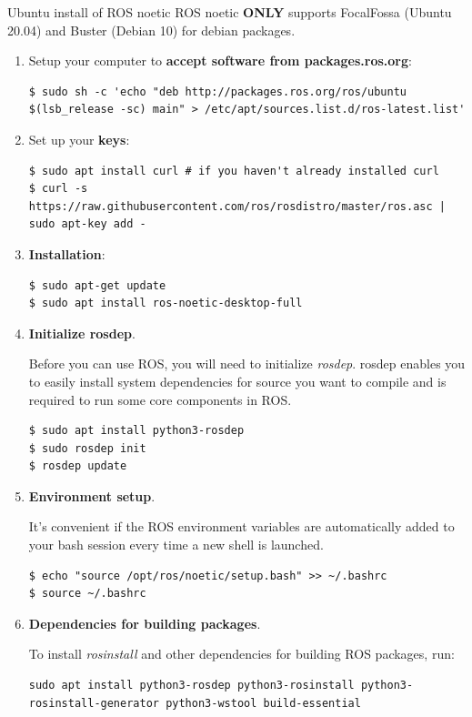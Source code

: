 \begin{frame}{Ubuntu install of ROS noetic}
ROS noetic \textbf{ONLY} supports FocalFossa (Ubuntu 20.04) and Buster (Debian 10) for debian packages. 
\begin{enumerate}
 \item Setup your computer to \textbf{accept software from packages.ros.org}:
\begin{lstlisting}[language=shell]
$ sudo sh -c 'echo "deb http://packages.ros.org/ros/ubuntu $(lsb_release -sc) main" > /etc/apt/sources.list.d/ros-latest.list'
\end{lstlisting}
 \item Set up your \textbf{keys}:
\begin{lstlisting}[language=shell]
$ sudo apt install curl # if you haven't already installed curl
$ curl -s https://raw.githubusercontent.com/ros/rosdistro/master/ros.asc | sudo apt-key add -
\end{lstlisting}
 \item \textbf{Installation}:
\begin{lstlisting}[language=shell]
$ sudo apt-get update
$ sudo apt install ros-noetic-desktop-full
\end{lstlisting}
 \item \textbf{Initialize rosdep}.
 
 \vspace{.1cm}
 Before you can use ROS, you will need to initialize \textit{rosdep}. rosdep enables you to easily install system dependencies for source you want to compile and is required to run some core components in ROS. 
\begin{lstlisting}[language=shell]
$ sudo apt install python3-rosdep
$ sudo rosdep init
$ rosdep update
\end{lstlisting}

 \item \textbf{Environment setup}.

 \vspace{.1cm}
 It's convenient if the ROS environment variables are automatically added to your bash session every time a new shell is launched.
\begin{lstlisting}[language=shell]
$ echo "source /opt/ros/noetic/setup.bash" >> ~/.bashrc
$ source ~/.bashrc
\end{lstlisting}

 \framebreak
 
 \item \textbf{Dependencies for building packages}.

 \vspace{.1cm}
 To install \textit{rosinstall} and other dependencies for building ROS packages, run: 
\begin{lstlisting}[language=shell]
sudo apt install python3-rosdep python3-rosinstall python3-rosinstall-generator python3-wstool build-essential
\end{lstlisting}
\end{enumerate}
\end{frame}

